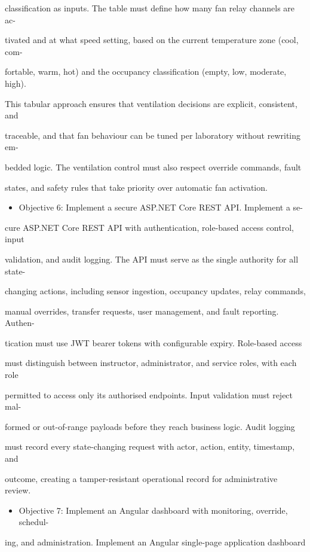 classiﬁcation as inputs. The table must deﬁne how many fan relay channels are ac-

tivated and at what speed setting, based on the current temperature zone (cool, com-

fortable, warm, hot) and the occupancy classiﬁcation (empty, low, moderate, high).

This tabular approach ensures that ventilation decisions are explicit, consistent, and

traceable, and that fan behaviour can be tuned per laboratory without rewriting em-

bedded logic. The ventilation control must also respect override commands, fault

states, and safety rules that take priority over automatic fan activation.

\begin{itemize}
  \item Objective 6: Implement a secure ASP.NET Core REST API. Implement a se-
\end{itemize}
cure ASP.NET Core REST API with authentication, role-based access control, input

validation, and audit logging. The API must serve as the single authority for all state-

changing actions, including sensor ingestion, occupancy updates, relay commands,

manual overrides, transfer requests, user management, and fault reporting. Authen-

tication must use JWT bearer tokens with conﬁgurable expiry. Role-based access

must distinguish between instructor, administrator, and service roles, with each role

permitted to access only its authorised endpoints. Input validation must reject mal-

formed or out-of-range payloads before they reach business logic. Audit logging

must record every state-changing request with actor, action, entity, timestamp, and

outcome, creating a tamper-resistant operational record for administrative review.

\begin{itemize}
  \item Objective 7: Implement an Angular dashboard with monitoring, override, schedul-
\end{itemize}
ing, and administration. Implement an Angular single-page application dashboard

